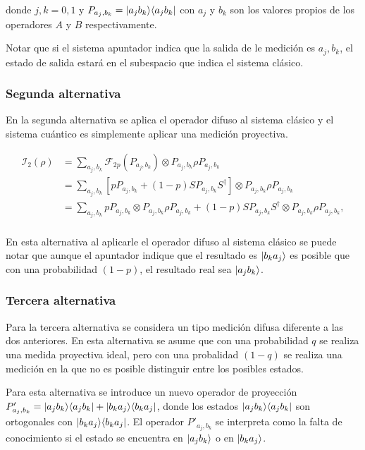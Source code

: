 donde $j,k=0,1$ y $P_{a_j,b_k}=|a_j b_k\rangle \langle a_j b_k|$ con $a_j$ y $b_k$ son los valores propios de los operadores $A$ y $B$ respectivamente.


Notar que si el sistema apuntador indica que la salida de le medición es $a_j,b_k$, el estado de salida estará en el subespacio que indica el sistema clásico.

\subsubsection{Segunda alternativa}


En la segunda alternativa se aplica el operador difuso al sistema clásico y el sistema cuántico es simplemente aplicar una medición proyectiva.

\begin{equation}
    \begin{split}
        \mathcal{I}_2(\rho)&=\sum_{a_j,b_k}\mathcal{F}_{2p}(P_{a_j,b_k})\otimes P_{a_j,b_k} \rho P_{a_j,b_k}\\
        &=\sum_{a_j,b_k}[pP_{a_j,b_k}+(1-p)SP_{a_j,b_k}S^\dagger]\otimes P_{a_j,b_k} \rho P_{a_j,b_k}\\
        &=\sum_{a_j,b_k} pP_{a_j,b_k} \otimes P_{a_j,b_k} \rho P_{a_j,b_k}+(1-p)SP_{a_j,b_k}S^\dagger\otimes P_{a_j,b_k} \rho P_{a_j,b_k},\\
    \end{split}
\end{equation} 


En esta alternativa al aplicarle el operador difuso al sistema clásico se puede notar que aunque el apuntador indique que el resultado es $|b_k a_j\rangle$ es posible que con una probabilidad $(1-p)$, el resultado real sea $|a_j b_k\rangle$.



\subsubsection{Tercera alternativa}
Para la tercera alternativa se considera un tipo medición difusa diferente a las dos anteriores. En esta alternativa se asume que con una probabilidad $q$ se realiza una medida proyectiva ideal, pero con una probalidad $(1-q)$ se realiza una medición en la que no es posible distinguir entre los posibles estados.

Para esta alternativa se introduce un nuevo operador de proyección $P'_{a_j,b_k}=|a_j b_k\rangle \langle a_j b_k|+|b_k a_j\rangle \langle b_k a_j|$, donde los estados $|a_j b_k\rangle \langle a_j b_k|$ son ortogonales con $|b_k a_j\rangle \langle b_k a_j|$. El operador $P'_{a_j,b_k}$ se interpreta como la falta de conocimiento si el estado se encuentra en $|a_j b_k\rangle$ o en $|b_k a_j\rangle$. 



